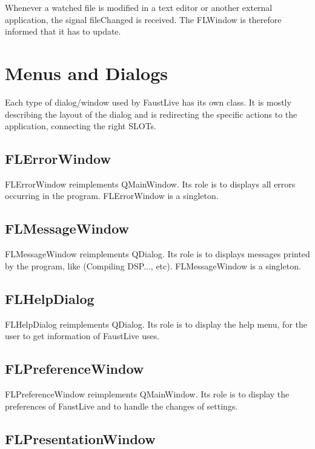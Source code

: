 \documentclass[a4paper]{article}
\begin{document}
{Whenever a watched file is modified in a text editor or another external application, the signal fileChanged is received. The FLWindow is therefore informed that it has to update. 

\section{Menus and Dialogs}

Each type of dialog/window used by FaustLive has its own class. It is mostly describing the layout of the dialog and is redirecting the specific actions to the application, connecting the right SLOTs. 

\subsection{FLErrorWindow}

FLErrorWindow reimplements QMainWindow. Its role is to displays all errors occurring in the program.
FLErrorWindow is a singleton.

\subsection{FLMessageWindow}

FLMessageWindow reimplements QDialog. Its role is to displays messages printed by the program, like (Compiling DSP..., etc).
FLMessageWindow is a singleton.

\subsection{FLHelpDialog}

FLHelpDialog reimplements QDialog. Its role is to display the help menu, for the user to get information of FaustLive uses. 

\subsection{FLPreferenceWindow}

FLPreferenceWindow reimplements QMainWindow. Its role is to display the preferences of FaustLive and to handle the changes of settings. 

\subsection{FLPresentationWindow}

}
\end{document}
